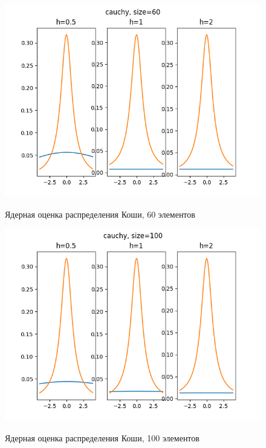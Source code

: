 \documentclass[12pt,a4paper]{article}
\begin{document}
			\begin{figure}[htp]
				{\includegraphics[width=1\linewidth]{../plots/cauchy_60.png}}
				\caption{Ядерная оценка распределения Коши, 60 элементов}
			\end{figure}
			\begin{figure}
				{\includegraphics[width=1\linewidth]{../plots/cauchy_100.png}}
				\caption{Ядерная оценка распределения Коши, 100 элементов}
			\end{figure}
			\newpage
			
\end{document}

